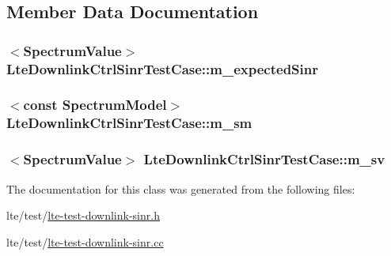 \subsection{Member Data Documentation}
\subsubsection[{\texorpdfstring{m\+\_\+expected\+Sinr}{m_expectedSinr}}]{$<${\bf Spectrum\+Value}$>$ Lte\+Downlink\+Ctrl\+Sinr\+Test\+Case\+::m\+\_\+expected\+Sinr\hspace{0.3cm}{\ttfamily [private]}}\hypertarget{classLteDownlinkCtrlSinrTestCase_a0ae82f18c62d462c2f5a88a9ac9aa0e4}{}\label{classLteDownlinkCtrlSinrTestCase_a0ae82f18c62d462c2f5a88a9ac9aa0e4}
\subsubsection[{\texorpdfstring{m\+\_\+sm}{m_sm}}]{$<$const {\bf Spectrum\+Model}$>$ Lte\+Downlink\+Ctrl\+Sinr\+Test\+Case\+::m\+\_\+sm\hspace{0.3cm}{\ttfamily [private]}}\hypertarget{classLteDownlinkCtrlSinrTestCase_a5778fea6faf53e8d6a3dc20c178c8a62}{}\label{classLteDownlinkCtrlSinrTestCase_a5778fea6faf53e8d6a3dc20c178c8a62}
\subsubsection[{\texorpdfstring{m\+\_\+sv}{m_sv}}]{$<${\bf Spectrum\+Value}$>$ Lte\+Downlink\+Ctrl\+Sinr\+Test\+Case\+::m\+\_\+sv\hspace{0.3cm}{\ttfamily [private]}}\hypertarget{classLteDownlinkCtrlSinrTestCase_a7c94e9a4f3c92b0d88e165916f718a6d}{}\label{classLteDownlinkCtrlSinrTestCase_a7c94e9a4f3c92b0d88e165916f718a6d}


The documentation for this class was generated from the following files\+:\begin{DoxyCompactItemize}
\item 
lte/test/\hyperlink{lte-test-downlink-sinr_8h}{lte-\/test-\/downlink-\/sinr.\+h}\item 
lte/test/\hyperlink{lte-test-downlink-sinr_8cc}{lte-\/test-\/downlink-\/sinr.\+cc}\end{DoxyCompactItemize}
